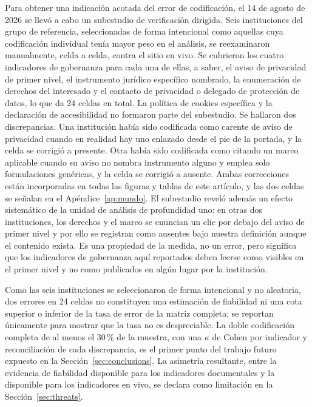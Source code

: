 \documentclass[pdflatex,sn-basic,Numbered,iicol]{sn-jnl}
\theoremstyle{thmstyleone}
\theoremstyle{thmstyletwo}
\theoremstyle{thmstylethree}
\begin{document}
Para obtener una indicaci\'on acotada del error de codificaci\'on, el 14 de agosto de 2026 se llev\'o a cabo un subestudio de verificaci\'on dirigida. Seis instituciones del grupo de referencia, seleccionadas de forma intencional como aquellas cuya codificaci\'on individual ten\'ia mayor peso en el an\'alisis, se reexaminaron manualmente, celda a celda, contra el sitio en vivo. Se cubrieron los cuatro indicadores de gobernanza para cada una de ellas, a saber, el aviso de privacidad de primer nivel, el instrumento jur\'idico espec\'ifico nombrado, la enumeraci\'on de derechos del interesado y el contacto de privacidad o delegado de protecci\'on de datos, lo que da 24 celdas en total. La pol\'itica de cookies espec\'ifica y la declaraci\'on de accesibilidad no formaron parte del subestudio. Se hallaron dos discrepancias. Una instituci\'on hab\'ia sido codificada como carente de aviso de privacidad cuando en realidad hay uno enlazado desde el pie de la portada, y la celda se corrigi\'o a presente. Otra hab\'ia sido codificada como citando un marco aplicable cuando su aviso no nombra instrumento alguno y emplea solo formulaciones gen\'ericas, y la celda se corrigi\'o a ausente. Ambas correcciones est\'an incorporadas en todas las figuras y tablas de este art\'iculo, y las dos celdas se se\~nalan en el Ap\'endice~\ref{ap:mundo}. El subestudio revel\'o adem\'as un efecto sistem\'atico de la unidad de an\'alisis de profundidad uno: en otras dos instituciones, los derechos y el marco se enuncian un clic por debajo del aviso de primer nivel y por ello se registran como ausentes bajo nuestra definici\'on aunque el contenido exista. Es una propiedad de la medida, no un error, pero significa que los indicadores de gobernanza aqu\'i reportados deben leerse como \guillemotleft visibles en el primer nivel\guillemotright{} y no como \guillemotleft publicados en alg\'un lugar por la instituci\'on\guillemotright.

Como las seis instituciones se seleccionaron de forma intencional y no aleatoria, dos errores en 24 celdas no constituyen una estimaci\'on de fiabilidad ni una cota superior o inferior de la tasa de error de la matriz completa; se reportan \'unicamente para mostrar que la tasa no es despreciable. La doble codificaci\'on completa de al menos el 30\,\% de la muestra, con una $\kappa$ de Cohen por indicador y reconciliaci\'on de cada discrepancia, es el primer punto del trabajo futuro expuesto en la Secci\'on~\ref{sec:conclusions}. La asimetr\'ia resultante, entre la evidencia de fiabilidad disponible para los indicadores documentales y la disponible para los indicadores en vivo, se declara como limitaci\'on en la Secci\'on~\ref{sec:threats}.
\end{document}
